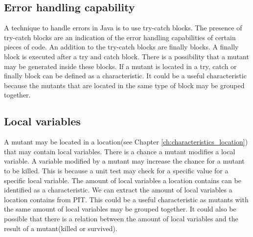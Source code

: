\documentclass[../../main]{subfiles}
\begin{document}
\subsection{Error handling capability}
A technique to handle errors in Java is to use try-catch blocks\cite{javaDocs}. 
The presence of try-catch blocks are an indication of the error handling capabilities of certain pieces of code.
An addition to the try-catch blocks are finally blocks.
A finally block is executed after a try and catch block\cite{javaDocs}.
There is a possibility that a mutant may be generated inside these blocks.
If a mutant is located in a try, catch or finally block can be defined as a characteristic.
It could be a useful characteristic because the mutants that are located in the same type of block may be grouped together.

\subsection{Local variables}
A mutant may be located in a location(see Chapter \ref{ch:characteristics_location}) that may contain local variables.
There is a chance a mutant modifies a local variable.
A variable modified by a mutant may increase the chance for a mutant to be killed.
This is because a unit test may check for a specific value for a specific local variable.
The amount of local variables a location contains can be identified as a characteristic.
We can extract the amount of local variables a location contains from PIT.
This could be a useful characteristic as mutants with the same amount of local variables may be grouped together.
It could also be possible that there is a relation between the amount of local variables and the result of a mutant(killed or survived).
\end{document}

